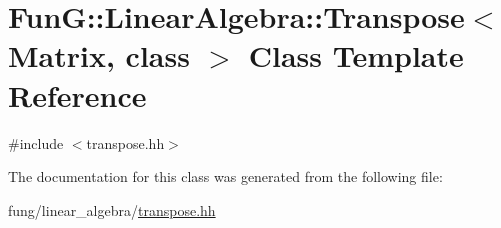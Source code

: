 \hypertarget{classFunG_1_1LinearAlgebra_1_1Transpose}{}\section{FunG\+:\+:Linear\+Algebra\+:\+:Transpose$<$ Matrix, class $>$ Class Template Reference}
\label{classFunG_1_1LinearAlgebra_1_1Transpose}


{\ttfamily \#include $<$transpose.\+hh$>$}



The documentation for this class was generated from the following file\+:\begin{DoxyCompactItemize}
\item 
fung/linear\+\_\+algebra/\hyperlink{transpose_8hh}{transpose.\+hh}\end{DoxyCompactItemize}
